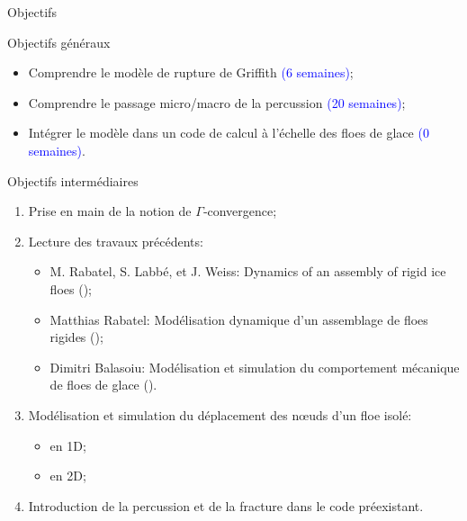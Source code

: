 
\begin{frame}{Objectifs}

  \begin{exampleblock}{Objectifs généraux}

    \begin{itemize}
      \item Comprendre le modèle de rupture de Griffith \textcolor{blue}{(6 semaines)}; 
      \item Comprendre le passage micro/macro de la percussion \textcolor{blue}{(20 semaines)};
      \item Intégrer le modèle dans un code de calcul à l’échelle des floes de glace \textcolor{blue}{(0 semaines)}.
    \end{itemize}
  \end{exampleblock}


  \begin{block}{Objectifs intermédiaires}

    \begin{enumerate}
      \item Prise en main de la notion de $\Gamma$‑convergence;
      \item Lecture des travaux précédents:
      \begin{itemize}
        \item \alert{M. Rabatel, S. Labbé, et J. Weiss}: Dynamics of an assembly of rigid ice floes (\citeyear{rabatel2015dynamics}); 
        \item \alert{Matthias Rabatel}: Modélisation dynamique d’un assemblage de floes rigides (\citeyear{rabatel2015modelisation});
        \item \alert{Dimitri Balasoiu}: Modélisation et simulation du comportement mécanique de floes de glace (\citeyear{balasoiu2020modelisation}).
      \end{itemize}
      
      \item Modélisation et simulation du déplacement des n\oe{}uds d'un floe isolé:
      \begin{itemize}
        \item en 1D;
        \item en 2D;
      \end{itemize}

      \item Introduction de la percussion et de la fracture dans le code préexistant.

    \end{enumerate}
  \end{block}

\end{frame}
